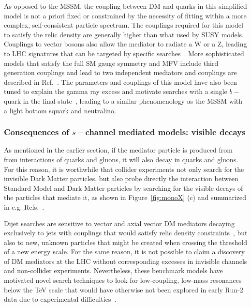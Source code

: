 As opposed to the MSSM, the coupling between DM and quarks in this simplified model is not a priori fixed or constrained by the necessity of fitting within a more complex, self-consistent particle spectrum. The couplings required for this model to satisfy the relic density are generally higher than what used by SUSY models. 
Couplings to vector bosons also allow the mediator to radiate a W or a Z, leading to LHC signatures that can be targeted by specific searches~\cite{Bell:2012rg}. 
More sophisticated models that satisfy the full SM gauge symmetry and MFV include third generation couplings and lead to two independent mediators and couplings are described in Ref.~\cite{Ko:2016zxg}. 
The parameters and couplings of this model have also been tuned to explain the gamma ray excess and motivate searches with a single $b-$quark in the final state~\cite{Agrawal:2014una}, leading to a similar phenomenology as the MSSM with a light bottom squark and neutralino. 

\subsubsection{Consequences of $s-$channel mediated models: visible decays}
\label{sec:MediatorSearches}

As mentioned in the earlier section, if the mediator particle is produced from from interactions of
quarks and gluons, it will also decay in quarks and gluons. 
For this reason, it is worthwhile that collider experiments not only search for
the invisible Dark Matter particles, but also probe directly the interaction between Standard Model and 
Dark Matter particles by searching for the visible decays of the particles that mediate it, as shown 
in Figure~\ref{fig:monoX} (c) and summarized in e.g. Refs.~\cite{Liew:2016oon,Fairbairn:2016iuf}. 


Dijet searches are sensitive to vector and axial vector DM mediators decaying 
exclusively to jets with couplings that would satisfy relic density constraints~\cite{Chala:2015ama},
but also to new, unknown particles that might be created when crossing 
the threshold of a new energy scale. For the same reason, 
it is not possible to claim a discovery of DM mediators at the LHC without
corresponding excesses in invisible channels and non-collider experiments. 
Nevertheless, these benchmark models have motivated novel search techniques
to look for low-coupling, low-mass resonances below the TeV scale that would
have otherwise not been explored in early Run-2 data due to experimental difficulties~\cite{An:2012ue,Dobrescu:2013coa}. 

